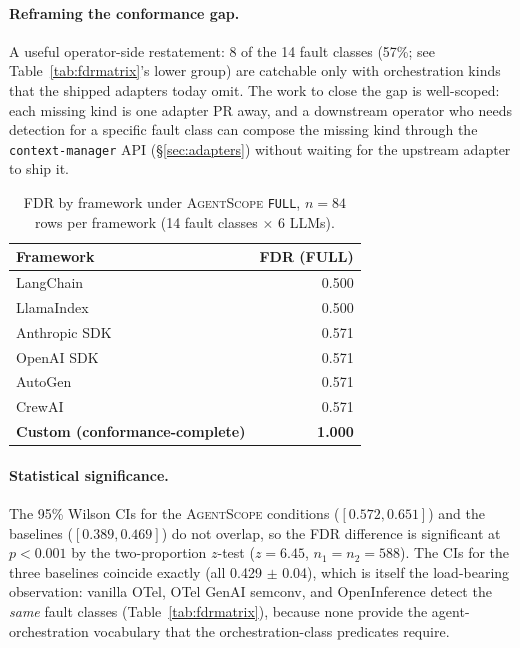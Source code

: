 \documentclass[sigplan,10pt,anonymous,review]{acmart}
\newcommand{\sysname}{\textsc{AgentScope}\xspace}
\begin{document}
\paragraph{Reframing the conformance gap.} A useful operator-side
restatement: 8 of the 14 fault classes (57\%; see
Table~\ref{tab:fdrmatrix}'s lower group) are catchable only with
orchestration kinds that the shipped adapters today omit. The work to
close the gap is well-scoped: each missing kind is one adapter PR away,
and a downstream operator who needs detection for a specific fault
class can compose the missing kind through the
\texttt{context-manager} API (\S\ref{sec:adapters}) without waiting
for the upstream adapter to ship it.

\begin{table}[t]
\centering
\small
\caption{FDR by framework under \sysname{} \texttt{FULL}, $n=84$ rows
per framework (14 fault classes $\times$ 6 LLMs).}
\label{tab:fdrframework}
\begin{tabular}{@{}lr@{}}
\toprule
\textbf{Framework} & \textbf{FDR (FULL)} \\
\midrule
LangChain      & 0.500 \\
LlamaIndex     & 0.500 \\
Anthropic SDK  & 0.571 \\
OpenAI SDK     & 0.571 \\
AutoGen        & 0.571 \\
CrewAI         & 0.571 \\
\midrule
\textbf{Custom (conformance-complete)} & \textbf{1.000} \\
\bottomrule
\end{tabular}
\end{table}

\paragraph{Statistical significance.} The 95\% Wilson CIs for the
\sysname{} conditions ($[0.572, 0.651]$) and the baselines
($[0.389, 0.469]$) do not overlap, so the FDR difference is significant
at $p < 0.001$ by the two-proportion $z$-test ($z = 6.45$, $n_1 = n_2 =
588$). The CIs for the three baselines coincide exactly (all 0.429
$\pm$ 0.04), which is itself the load-bearing observation: vanilla
OTel, OTel GenAI semconv, and OpenInference detect the \emph{same}
fault classes (Table~\ref{tab:fdrmatrix}), because none provide the
agent-orchestration vocabulary that the orchestration-class predicates
require.
\end{document}
